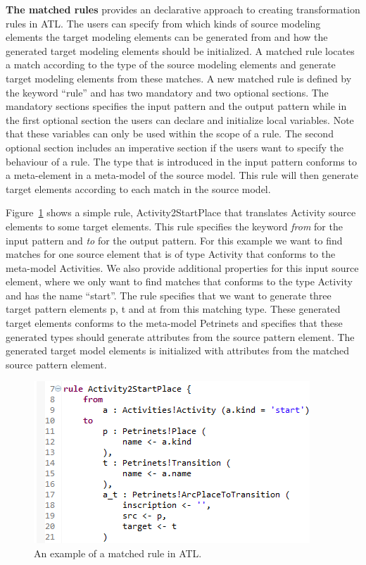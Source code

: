 \textbf{The matched rules} provides an declarative approach to
creating transformation rules in ATL. The users can specify from which kinds of
source modeling elements the target modeling elements can be generated from and
how the generated target modeling elements should be initialized. A matched rule
locates a match according to the type of the source modeling elements and generate target modeling
elements from these matches. A new matched rule is defined by the keyword
``rule'' and has two mandatory and two optional sections. The mandatory
sections specifies the input pattern and the output pattern while in the first
optional section the users can declare and initialize local variables. Note
that these variables can only be used within the scope of a rule. The second
optional section includes an imperative section if the users want to specify the
behaviour of a rule. The type that is introduced in the input pattern
conforms to a meta-element in a meta-model of the source model. This rule will
then generate target elements according to each match in the source model.

Figure~\ref{fig:ATL_Example} shows a simple rule, Activity2StartPlace that
translates Activity source elements to some target elements. This rule
specifies the keyword \textit{from} for the input pattern and \textit{to} for
the output pattern. For this example we want to find matches for one source
element that is of type Activity that conforms to the meta-model Activities. We
also provide additional properties for this input source element, where we only
want to find matches that conforms to the type Activity and has the name
``start''. The rule specifies that we want to generate three target pattern
elements p, t and a\textunderscore t from this matching type. These generated
target elements conforms to the meta-model Petrinets and specifies that these
generated types should generate attributes from the source pattern element. The
generated target model elements is initialized with attributes from the matched
source pattern element.

\begin{figure}[H]
	\centering
	\includegraphics[scale=0.7]{figures/ATL_Example.png}
	\caption[Example of a matched rule in ATL]
	{An example of a matched rule in ATL.}
	\label{fig:ATL_Example}
\end{figure}

